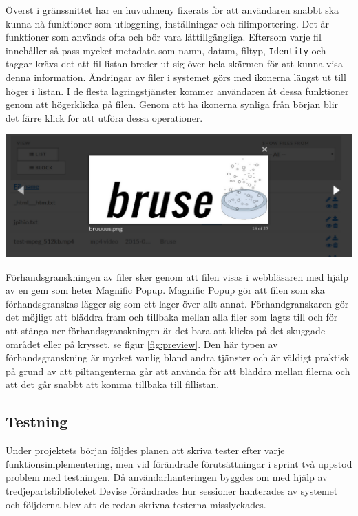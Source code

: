 Överst i gränssnittet har en huvudmeny fixerats för att användaren snabbt ska
kunna nå funktioner som utloggning, inställningar och filimportering. Det är
funktioner som används ofta och bör vara lättillgängliga. Eftersom varje fil
innehåller så pass mycket metadata som namn, datum, filtyp, \texttt{Identity}
och taggar krävs det att fil-listan breder ut sig över hela skärmen för att
kunna visa denna information. Ändringar av filer i systemet görs med ikonerna
längst ut till höger i listan. I de flesta lagringstjänster kommer användaren
åt dessa funktioner genom att högerklicka på filen. Genom att ha ikonerna
synliga från början blir det färre klick för att utföra dessa operationer.

\begin{Figure}
  \centering
    \includegraphics[width=0.9\linewidth]{figures/screenshots/preview.png}
\end{Figure}

Förhandsgranskningen av filer sker genom att filen visas i webbläsaren med
hjälp av en gem som heter Magnific Popup. Magnific Popup gör att filen som ska
förhandsgranskas lägger sig som ett lager över allt annat. Förhandgranskaren
gör det möjligt att bläddra fram och tillbaka mellan alla filer som lagts till
och för att stänga ner förhandsgranskningen är det bara att klicka på det
skuggade området eller på krysset, se figur \ref{fig:preview}. Den här typen av
förhandsgranskning är mycket vanlig bland andra tjänster och är väldigt
praktisk på grund av att piltangenterna går att använda för att bläddra mellan
filerna och att det går snabbt att komma tillbaka till fillistan.

\subsection{Testning}

Under projektets början följdes planen att skriva tester efter varje funktionsimplementering, men vid förändrade förutsättningar i sprint två uppstod problem med testningen. Då användarhanteringen byggdes om med hjälp av tredjepartsbiblioteket Devise förändrades hur sessioner hanterades av systemet och följderna blev att de redan skrivna testerna misslyckades.


